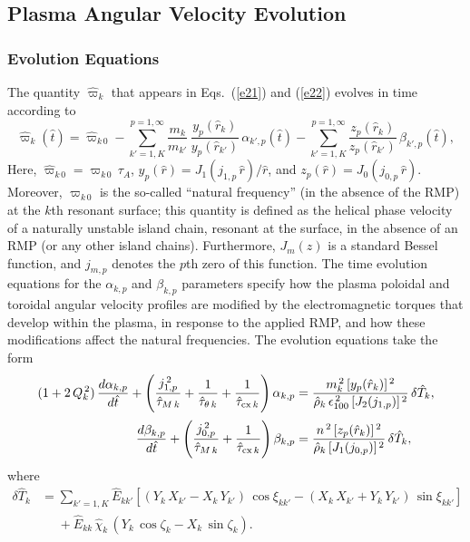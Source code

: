 \documentclass[12pt,prb,aps]{revtex4-1}
\begin{document}
\subsection{Plasma Angular Velocity Evolution}\label{a4}
\subsubsection{Evolution Equations}
The quantity $\hat{\varpi}_k$ that appears in Eqs.~(\ref{e21}) and (\ref{e22}) evolves in time according to\,\cite{rftor}
\begin{equation}\label{e19a}
\hat{\varpi}_k(\hat{t})= \hat{\varpi}_{k\,0}-\sum_{k'=1,K}^{p=1,\infty} \frac{m_k}{m_{k'}}\,\frac{y_p(\hat{r}_k)}{y_p(\hat{r}_{k'})}\,\alpha_{k',p}(\hat{t})-\sum_{k'=1,K}^{p=1,\infty}\frac{z_p(\hat{r}_k)}{z_p(\hat{r}_{k'})}\,\beta_{k',p}(\hat{t}),
\end{equation}
Here, $\hat{\varpi}_{k\,0}= \varpi_{k\,0}\,\tau_A$, $y_p(\hat{r})=J_1(j_{1,p}\,\hat{r})/\hat{r}$, and $z_p(\hat{r})=J_0(j_{0,p}\,\hat{r})$. Moreover, $\varpi_{k\,0}$
is the so-called ``natural frequency''  (in the absence of the RMP) at the $k$th resonant surface; this quantity is defined as the helical phase velocity of a naturally unstable island chain, resonant at the surface, in the
absence of an RMP (or any other island chains). Furthermore, $J_m(z)$ is a standard Bessel function, and $j_{m,p}$ denotes the $p$th zero of this function. 
The time evolution equations for the $\alpha_{k,p}$ and $\beta_{k,p}$ parameters specify how the
plasma poloidal and toroidal angular velocity profiles are modified by the electromagnetic torques that develop within the plasma, in response to the applied
RMP, and how these modifications affect the natural frequencies. The evolution equations take the form\,\cite{rftor}
\begin{align}
(1+2\,Q_k^{\,2})\,\frac{d\alpha_{k,p}}{d\hat{t}}+ \left(\frac{j_{1,p}^{\,2}}{\hat{\tau}_{M\,k}}+\frac{1}{\hat{\tau}_{\theta\,k}}+\frac{1}{\hat{\tau}_{{\rm cx}\,k}}\right)\alpha_{k,p}&=
\frac{m_k^{\,2}\,[y_p(\hat{r}_k)]^{\,2}}{\hat{\rho}_k\,\epsilon_{100}^{\,2}\,[J_2(j_{1,p})]^{\,2}}\,\delta\hat{T}_k,\\[0.5ex]
\frac{d\beta_{k,p}}{d\hat{t}}+ \left(\frac{j_{0,p}^{\,2}}{\hat{\tau}_{M\,k}}+\frac{1}{\hat{\tau}_{{\rm cx}\,k}}\right)\beta_{k,p}&=
\frac{n^{\,2}\,[z_p(\hat{r}_k)]^{\,2}}{\hat{\rho}_k\,[J_1(j_{0,p})]^{\,2}}\,\delta\hat{T}_k,
\end{align}
where
\begin{align}\label{e24a}
\delta \hat{T}_k&= \sum_{k'=1,K}\hat{E}_{kk'}\left[(Y_k\,X_{k'}-X_k\,Y_{k'})\,\cos\xi_{kk'}- (X_k\,X_{k'}+Y_k\,Y_{k'})\,\sin\xi_{kk'}\right]\nonumber\\[0.5ex]
&\phantom{=}+\hat{E}_{kk}\,\hat{\chi}_k\,(Y_k\,\cos\zeta_k-X_k\,\sin\zeta_k).
\end{align}
\end{document}
